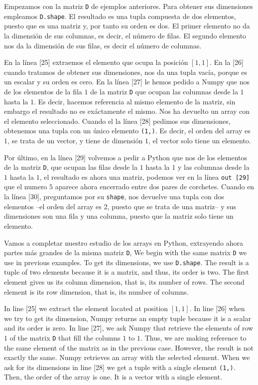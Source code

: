  \begin{paracol}{2}
 Empezamos con la matriz \texttt{D} de ejemplos anteriores. Para obtener sus dimensiones empleamos \texttt{D.shape}. El resultado es una tupla compuesta de dos elementos, puesto que es una matriz y, por tanto su orden es dos. El primer elemento no da la dimensión de sus columnas, es decir, el número de filas. El segundo elemento nos da la dimensión de sus filas, es decir el número de columnas. 
 
 En la línea [25] extraemos el elemento que ocupa la posición $[1,1]$. En la [26] cuando tratamos de obtener sus dimensiones, nos da una tupla vacía, porque es un escalar y su orden es cero. En la línea [27] le hemos pedido a Numpy que nos de los elementos de la fila $1$ de la matriz \texttt{D} que ocupan las columnas desde la $1$ hasta la $1$. Es decir, hacemos referencia al mismo elemento de la matriz, sin embargo el resultado no es exáctamente el mismo. Nos ha devuelto un array con el elemento seleccionado. Cuando el la línea [28] pedimos sus dimensiones, obtenemos una tupla con un único elemento \texttt{(1,)}. Es decir, el orden del array es $1$, se trata de un vector, y tiene de dimensión $1$, el vector solo tiene un elemento. 
 
 Por último, en la línea [29] volvemos a pedir a Python que nos de los elementos de la matriz \texttt{D}, que ocupan las filas desde la $1$ hasta la $1$ y las columnas desde la $1$ hasta la $1$, el resultado es ahora una matriz, podemos ver en la línea \texttt{out [29]} que el numero $5$ aparece ahora encerrado entre dos pares de corchetes. Cuando en la línea [30], preguntamos por su \texttt{shape}, nos devuelve una tupla con dos elementos --el orden del array es $2$, puesto que se trata de una matriz-- y sus dimensiones son una fila y una columna, puesto que la matriz solo tiene un elemento.  

 Vamos a completar nuestro estudio de los arrays en Python, extrayendo ahora partes más grandes de la misma matriz \texttt{D},
 \switchcolumn
 We begin with the same matrix \texttt{D} we use in previous examples. To get its dimensions, we use \texttt{D.shape}. The result is a tuple of two elements because it is a matrix, and thus, its order is two. The first element gives us its column dimension, that is, its number of rows. The second element is its row dimension, that is, its number of columns.

 In line [25] we extract the element located at position $[1,1]$. In line [26] when we try to get its dimension, Numpy returns an empty tuple because it is a scalar and its order is zero. In line [27], we ask Numpy that retrieve the elements of row $1$ of the matrix \texttt{D} that fill the columns $1$ to $1$. Thus, we are making reference to the same element of the matrix as in the previous case. However, the result is not exactly the same. Numpy retrieves an array with the selected element. When we ask for its dimensions in line [28] we get a tuple with a single element \texttt{(1,)}. Then, the order of the array is one. It is a vector with a single element.


\end{paracol}
